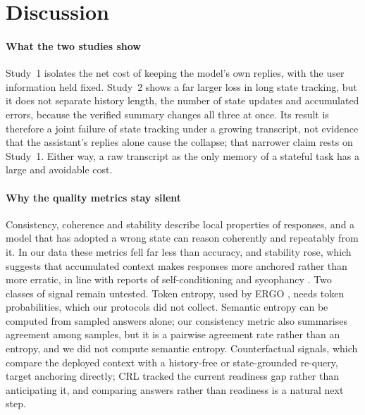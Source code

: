 \section{Discussion}
\label{sec:discussion}

\paragraph{What the two studies show}
Study~1 isolates the net cost of keeping the model's own replies, with the user
information held fixed. Study~2 shows a far larger loss in long state tracking,
but it does not separate history length, the number of state updates and
accumulated errors, because the verified summary changes all three at once.
Its result is therefore a joint failure of state tracking under a growing
transcript, not evidence that the assistant's replies alone cause the collapse;
that narrower claim rests on Study~1. Either way, a raw transcript as the only
memory of a stateful task has a large and avoidable cost.

\paragraph{Why the quality metrics stay silent}
Consistency, coherence and stability describe local properties of responses,
and a model that has adopted a wrong state can reason coherently and repeatably
from it. In our data these metrics fell far less than accuracy, and stability rose,
which
suggests that accumulated context makes responses more anchored rather than
more erratic, in line with reports of self-conditioning and sycophancy
\citep{sinha2025illusion,sharma2024sycophancy}. Two classes of signal remain
untested. Token entropy, used by ERGO \citep{khalid2025ergo}, needs token
probabilities, which our protocols did not collect. Semantic entropy
\citep{farquhar2024detecting} can be computed from sampled answers alone; our
consistency metric also summarises agreement among samples, but it is a
pairwise agreement rate rather than an entropy, and we did not compute
semantic entropy. Counterfactual signals, which compare the deployed context
with a history-free or state-grounded re-query, target anchoring directly;
CRL tracked the current readiness gap rather than anticipating it, and
comparing answers rather than readiness is a natural next step.

